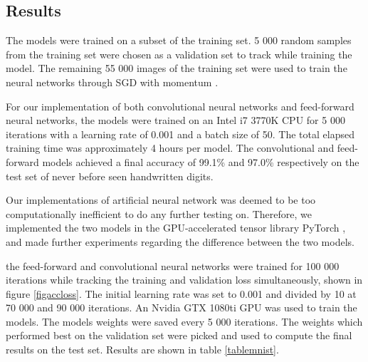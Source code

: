 \documentclass[a4paper, twoside]{article}
\begin{document}
\subsection{Results}
The models were trained on a subset of the training set. 5 000 random samples from the training set were chosen as a validation set to track while training the model. The remaining 55 000 images of the training set were used to train the neural networks through SGD with momentum \cite{cs231n}.

For our implementation of both convolutional neural networks and feed-forward neural networks, the models were trained on an Intel i7 3770K CPU for 5 000 iterations with a learning rate of 0.001 and a batch size of 50. The total elapsed training time was approximately 4 hours per model. The convolutional and feed-forward models achieved a final accuracy of 99.1\% and 97.0\% respectively on the test set of never before seen handwritten digits. 

Our implementations of artificial neural network was deemed to be too computationally inefficient to do any further testing on. Therefore, we implemented the two models in the GPU-accelerated tensor library PyTorch \cite{PyTorch}, and made further experiments regarding the difference between the two models.

the feed-forward and convolutional neural networks were trained for 100 000 iterations while tracking the training and validation loss simultaneously, shown in figure \ref{figaccloss}. The initial learning rate was set to 0.001 and divided by 10 at 70 000 and 90 000 iterations. An Nvidia GTX 1080ti GPU was used to train the models. The models weights were saved every 5 000 iterations. The weights which performed best on the validation set were picked and used to compute the final results on the test set. Results are shown in table \ref{tablemnist}.
\end{document}
